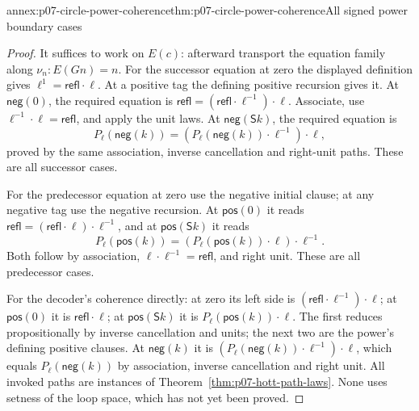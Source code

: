 \begin{annexitem}{annex:p07-circle-power-coherence}{thm:p07-circle-power-coherence}{All signed power boundary cases}
\begin{proof}
It suffices to work on \(E(c)\): afterward transport the equation family
along \(\nu_n:E(Gn)=n\).
For the successor equation at zero the displayed definition gives
\(\ell^{1}=\mathsf{refl}\cdot\ell\).
At a positive tag the defining positive recursion gives it.
At \(\mathsf{neg}(0)\), the required equation is
\(\mathsf{refl}=(\mathsf{refl}\cdot\ell^{-1})\cdot\ell\).
Associate, use \(\ell^{-1}\cdot\ell=\mathsf{refl}\), and apply the
unit laws. At \(\mathsf{neg}(\mathsf Sk)\), the required equation is
\[
P_\ell(\mathsf{neg}(k))
 =(P_\ell(\mathsf{neg}(k))\cdot\ell^{-1})\cdot\ell,
\]
proved by the same association, inverse cancellation and right-unit
paths. These are all successor cases.

For the predecessor equation at zero use the negative initial clause;
at any negative tag use the negative recursion. At \(\mathsf{pos}(0)\)
it reads
\(\mathsf{refl}=(\mathsf{refl}\cdot\ell)\cdot\ell^{-1}\),
and at \(\mathsf{pos}(\mathsf Sk)\) it reads
\[
P_\ell(\mathsf{pos}(k))
 =(P_\ell(\mathsf{pos}(k))\cdot\ell)\cdot\ell^{-1}.
\]
Both follow by association, \(\ell\cdot\ell^{-1}=\mathsf{refl}\),
and right unit. These are all predecessor cases.

For the decoder's coherence directly: at zero its left side is
\((\mathsf{refl}\cdot\ell^{-1})\cdot\ell\); at
\(\mathsf{pos}(0)\) it is \(\mathsf{refl}\cdot\ell\); at
\(\mathsf{pos}(\mathsf Sk)\) it is
\(P_\ell(\mathsf{pos}(k))\cdot\ell\).
The first reduces propositionally by inverse cancellation and units;
the next two are the power's defining positive clauses.
At \(\mathsf{neg}(k)\) it is
\((P_\ell(\mathsf{neg}(k))\cdot\ell^{-1})\cdot\ell\),
which equals \(P_\ell(\mathsf{neg}(k))\) by association, inverse
cancellation and right unit. All invoked paths are instances of
Theorem~\ref{thm:p07-hott-path-laws}. None uses setness of the loop
space, which has not yet been proved.
\end{proof}
\end{annexitem}

